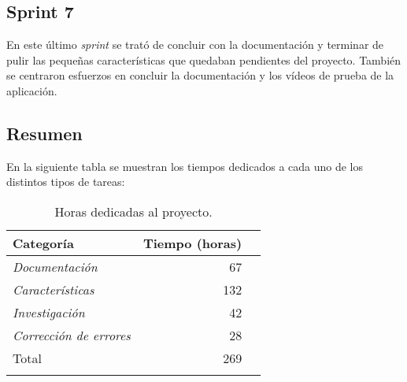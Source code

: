 
\subsection{Sprint 7}

En este último \emph{sprint} se trató de concluir con la documentación y terminar de pulir las pequeñas características que quedaban pendientes del proyecto. También se centraron esfuerzos en concluir la documentación y los vídeos de prueba de la aplicación.


\subsection{Resumen}

En la siguiente tabla se muestran los tiempos dedicados a cada uno de los distintos tipos de tareas:



\begin{longtable}[]{@{}lrr@{}}
\toprule
\begin{minipage}[b]{0.37\columnwidth}\raggedright\strut
Categoría\strut
\end{minipage} & \begin{minipage}[b]{0.37\columnwidth}\raggedleft\strut
Tiempo (horas)\strut
\end{minipage}\tabularnewline
\midrule
\endhead
\begin{minipage}[t]{0.37\columnwidth}\raggedright\strut
\emph{Documentación}\strut
\end{minipage} & \begin{minipage}[t]{0.37\columnwidth}\raggedleft\strut
67\strut
\end{minipage}\tabularnewline
\begin{minipage}[t]{0.37\columnwidth}\raggedright\strut
\emph{Características}\strut
\end{minipage} & \begin{minipage}[t]{0.37\columnwidth}\raggedleft\strut
132\strut
\end{minipage}\tabularnewline
\begin{minipage}[t]{0.37\columnwidth}\raggedright\strut
\emph{Investigación}\strut
\end{minipage}& \begin{minipage}[t]{0.37\columnwidth}\raggedleft\strut
42\strut
\end{minipage}\tabularnewline
\begin{minipage}[t]{0.37\columnwidth}\raggedright\strut
\emph{Corrección de errores}\strut
\end{minipage} & \begin{minipage}[t]{0.37\columnwidth}\raggedleft\strut
28\strut
\end{minipage}\tabularnewline
\midrule
\begin{minipage}[t]{0.37\columnwidth}\raggedright\strut
Total\strut
\end{minipage} & \begin{minipage}[t]{0.37\columnwidth}\raggedleft\strut
269\strut
\end{minipage}\tabularnewline
\bottomrule
\caption{Horas dedicadas al proyecto.}
\end{longtable}



